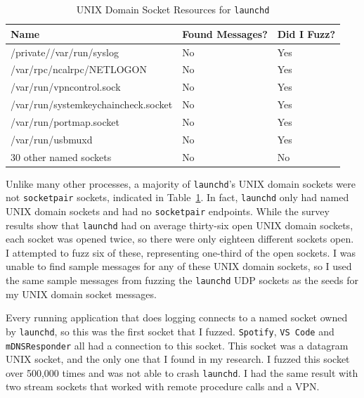 \begin{table}
\centering
\begin{normalsize}
\begin{tabular}{ l | l | l }
\textbf{Name} & \textbf{Found Messages?} & \textbf{Did I Fuzz?} \\ \hline
/private//var/run/syslog & No & Yes \\ \hline
/var/rpc/ncalrpc/NETLOGON & No & Yes \\ \hline
/var/run/vpncontrol.sock & No & Yes \\ \hline
/var/run/systemkeychaincheck.socket & No & Yes \\ \hline
/var/run/portmap.socket & No & Yes \\ \hline
/var/run/usbmuxd & No & Yes \\ \hline
30 other named sockets & No & No \\ \hline
\end{tabular}
\caption{UNIX Domain Socket Resources for \texttt{launchd}}
\label{tab:launchdUnixTab}
\end{normalsize}
\end{table} 

Unlike many other processes, a majority of \texttt{launchd}'s UNIX domain sockets were not \texttt{socketpair} sockets, indicated in Table~\ref{tab:launchdUnixTab}.  In fact, \texttt{launchd} only had named UNIX domain sockets and had no \texttt{socketpair} endpoints.  While the survey results show that \texttt{launchd} had on average thirty-six open UNIX domain sockets, each socket was opened twice, so there were only eighteen different sockets open.  I attempted to fuzz six of these, representing one-third of the open sockets.  I was unable to find sample messages for any of these UNIX domain sockets, so I used the same sample messages from fuzzing the \texttt{launchd} UDP sockets as the seeds for my UNIX domain socket messages.

Every running application that does logging connects to a named socket owned by \texttt{launchd}, so this was the first socket that I fuzzed.  \texttt{Spotify}, \texttt{VS Code} and \texttt{mDNSResponder} all had a connection to this socket.  This socket was a datagram UNIX socket, and the only one that I found in my research.  I fuzzed this socket over 500,000 times and was not able to crash \texttt{launchd}.  I had the same result with two stream sockets that worked with remote procedure calls and a VPN.

